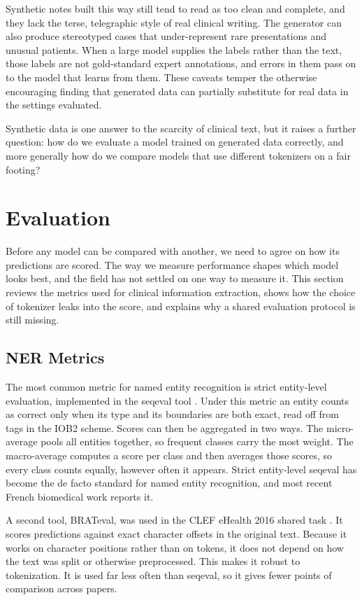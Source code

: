 Synthetic notes built this way still tend to read as too clean and complete, and
they lack the terse, telegraphic style of real clinical writing. The generator can also produce
stereotyped cases that under-represent rare presentations and unusual patients. When a large
model supplies the labels rather than the text, those labels are not gold-standard expert
annotations, and errors in them pass on to the model that learns from them. These caveats
temper the otherwise encouraging finding that generated data can partially substitute for real
data in the settings evaluated.

Synthetic data is one answer to the scarcity of clinical text, but it raises a further
question: how do we evaluate a model trained on generated data correctly, and more generally
how do we compare models that use different tokenizers on a fair footing?
\section{Evaluation}
\label{sec:ie-evaluation}

Before any model can be compared with another, we need to agree on how its predictions are
scored. The way we measure performance shapes which model looks best, and the field has not
settled on one way to measure it. This section reviews the metrics used for clinical information
extraction, shows how the choice of tokenizer leaks into the score, and explains why a shared
evaluation protocol is still missing.

\subsection{NER Metrics}

The most common metric for named entity recognition is strict entity-level evaluation,
implemented in the seqeval tool \citep{seqeval}. Under this metric an entity counts as correct
only when its type and its boundaries are both exact, read off from tags in the IOB2 scheme.
Scores can then be aggregated in two ways. The micro-average pools all entities together, so
frequent classes carry the most weight. The macro-average computes a score per class and then
averages those scores, so every class counts equally, however often it appears. Strict
entity-level seqeval has become the de facto standard for named entity recognition, and most
recent French biomedical work reports it.

A second tool, BRATeval, was used in the CLEF eHealth 2016 shared task
\citep{neveol_clinical_2016}. It scores predictions against exact character offsets in the
original text. Because it works on character positions rather than on tokens, it does not
depend on how the text was split or otherwise preprocessed. This makes it robust to
tokenization. It is used far less often than seqeval, so it gives fewer points of
comparison across papers.

